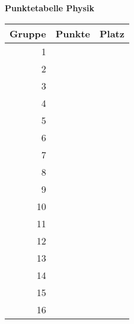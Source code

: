 \documentclass[a4paper,10pt]{article}
\begin{document}
\pagebreak

\begin{center}
 {\Huge \textbf{Punktetabelle Physik}} \vspace{2cm} \\
 \LARGE
 \begin{tabular}{|r|l|l|}
  \hline
  Gruppe & Punkte & Platz  \\ \hline
  1 &\hspace{5cm} & \hspace{3cm}\\ \hline 
  2 &\hspace{5cm} & \hspace{3cm}\\ \hline
  3 &\hspace{5cm} & \hspace{3cm}\\ \hline
  4 &\hspace{5cm} & \hspace{3cm}\\ \hline
  5 &\hspace{5cm} & \hspace{3cm}\\ \hline
  6 &\hspace{5cm} & \hspace{3cm}\\ \hline
  7 &\hspace{5cm} & \hspace{3cm}\\ \hline
  8 &\hspace{5cm} & \hspace{3cm}\\ \hline
  9 &\hspace{5cm} & \hspace{3cm}\\ \hline 
  10 &\hspace{5cm} & \hspace{3cm}\\ \hline
  11 &\hspace{5cm} & \hspace{3cm}\\ \hline
  12 &\hspace{5cm} & \hspace{3cm}\\ \hline
  13 &\hspace{5cm} & \hspace{3cm}\\ \hline
  14 &\hspace{5cm} & \hspace{3cm}\\ \hline
  15 &\hspace{5cm} & \hspace{3cm}\\ \hline
  16 &\hspace{5cm} & \hspace{3cm}\\ \hline
 \end{tabular}

\end{center}
\pagebreak
\end{document}
